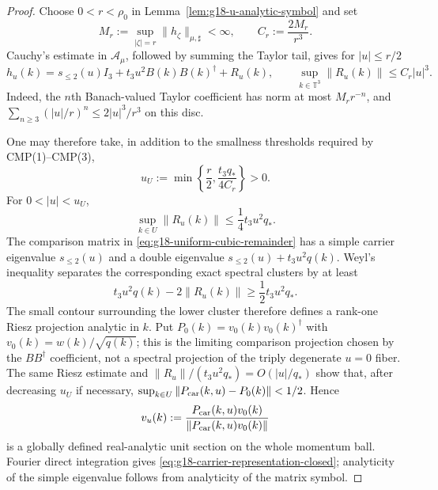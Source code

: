 \begin{proof}
Choose $0<r<\rho_0$ in Lemma~\ref{lem:g18-u-analytic-symbol} and set
\[
 M_r:=\sup_{|\zeta|=r}\|h_\zeta\|_{\mu,\sharp}<\infty,
 \qquad C_r:=\frac{2M_r}{r^3}.
\]
Cauchy's estimate in $\mathcal A_\mu$, followed by summing the Taylor tail,
gives for $|u|\le r/2$
\begin{equation}
 h_u(k)=s_{\le2}(u)I_3+t_3u^2B(k)B(k)^\dagger+R_u(k),
 \qquad
 \sup_{k\in\mathbb T^3}\|R_u(k)\|
 \le C_r|u|^3.
 \label{eq:g18-uniform-cubic-remainder}
\end{equation}
Indeed, the $n$th Banach-valued Taylor coefficient has norm at most
$M_rr^{-n}$, and
$\sum_{n\ge3}(|u|/r)^n\le2|u|^3/r^3$ on this disc.

One may therefore take, in addition to the smallness thresholds required by
CMP(1)--CMP(3),
\begin{equation}
 u_U:=\min\left\{\frac r2,
          \frac{t_3q_*}{4C_r}\right\}>0.
 \label{eq:g18-explicit-uU}
\end{equation}
For $0<|u|<u_U$,
\[
 \sup_{k\in U}\|R_u(k)\|
 \le\frac14t_3u^2q_*.
\]
The comparison matrix in
\eqref{eq:g18-uniform-cubic-remainder} has a simple carrier eigenvalue
$s_{\le2}(u)$ and a double eigenvalue
$s_{\le2}(u)+t_3u^2q(k)$.  Weyl's inequality separates the corresponding
exact spectral clusters by at least
\[
 t_3u^2q(k)-2\|R_u(k)\|
 \ge\frac12t_3u^2q_*.
\]
The small contour surrounding the lower cluster therefore defines a rank-one
Riesz projection analytic in $k$.  Put
$P_0(k)=v_0(k)v_0(k)^\dagger$ with
$v_0(k)=w(k)/\sqrt{q(k)}$; this is the limiting comparison projection chosen
by the $BB^\dagger$ coefficient, not a spectral projection of the triply
degenerate $u=0$ fiber.  The same Riesz estimate and
$\|R_u\|/(t_3u^2q_*)=O(|u|/q_*)$ show that, after decreasing $u_U$ if
necessary,
$\sup_{k\in U}\|P_{\rm car}(k,u)-P_0(k)\|<1/2$.  Hence
\[
 v_u(k):=\frac{P_{\rm car}(k,u)v_0(k)}
 {\|P_{\rm car}(k,u)v_0(k)\|}
\]
is a globally defined real-analytic unit section on the whole momentum ball.
Fourier direct integration gives
\eqref{eq:g18-carrier-representation-closed}; analyticity of the simple
eigenvalue follows from analyticity of the matrix symbol.
\end{proof}

